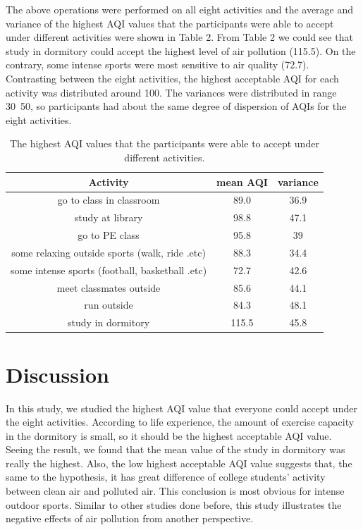 The above operations were performed on all eight activities and the average and variance of the highest AQI values that the participants were able to accept under different activities were shown in Table 2. From Table 2 we could see that study in dormitory could accept the highest level of air pollution (115.5). On the contrary, some intense sports were most sensitive to air quality (72.7). Contrasting between the eight activities, the highest acceptable AQI for each activity was distributed around 100. The variances were distributed in range 30~50, so participants had about the same degree of dispersion of AQIs for the eight activities.

\begin{table}
\centering
\caption{The highest AQI values that the participants were able to accept under different activities.}
\begin{tabular}{c|c|c}
Activity & mean AQI & variance \\
\hline
go to class in classroom & 89.0 & 36.9 \\
study at library & 98.8 & 47.1 \\
go to PE class & 95.8 & 39 \\
some relaxing outside sports (walk, ride .etc) & 88.3 & 34.4 \\
some intense sports (football, basketball .etc) & 72.7 & 42.6 \\
meet classmates outside & 85.6 & 44.1 \\
run outside & 84.3 & 48.1 \\
study in dormitory & 115.5 & 45.8

\end{tabular}
\end{table}

\section{Discussion}

In this study, we studied the highest AQI value that everyone could accept under the eight activities. According to life experience, the amount of exercise capacity in the dormitory is small, so it should be the highest acceptable AQI value. Seeing the result, we found that the mean value of the study in dormitory was really the highest. Also, the low highest acceptable AQI value suggests that, the same to the hypothesis, it has great difference of college students’ activity between clean air and polluted air. This conclusion is most obvious for intense outdoor sports. Similar to other studies done before, this study illustrates the negative effects of air pollution from another perspective.

